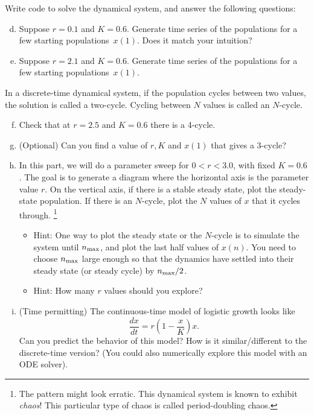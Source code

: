\documentclass{exam}
\begin{document}
Write code to solve the dynamical system, and answer the following questions:
\begin{enumerate}[a.]
\setcounter{enumi}{3}
\item Suppose $r=0.1$ and $K=0.6$. Generate time series of the populations for a few starting populations~$x(1)$. Does it match your intuition?
\item Suppose $r=2.1$ and $K=0.6$. Generate time series of the populations for a few starting populations~$x(1)$. 
\end{enumerate}
In a discrete-time dynamical system, if the population cycles between two values, the solution is called a two-cycle. Cycling between $N$ values is called an $N$-cycle. 
\begin{enumerate}[a.]
\setcounter{enumi}{5}
\item Check that at $r=2.5$ and $K=0.6$ there is a 4-cycle. 
\item (Optional) Can you find a value of $r,K$ and $x(1)$ that gives a 3-cycle?
\item In this part, we will do a parameter sweep for $0<r<3.0$, with fixed $K=0.6$. The goal is to generate a diagram where the horizontal axis is the parameter value $r$. On the vertical axis, if there is a stable steady state, plot the steady-state population. If there is an $N$-cycle, plot the $N$ values of $x$ that it cycles through. \footnote{The pattern might look erratic. This dynamical system is known to exhibit \emph{chaos}!  This particular type of chaos is called period-doubling chaos.}
\begin{itemize}
\item Hint: One way to plot the steady state or the $N$-cycle is to simulate the system until $n_{\rm max}$, and plot the last half values of $x(n)$. You need to choose $n_{\rm max}$ large enough so that the dynamics have settled into their steady state (or steady cycle) by $n_{\rm max}/2$.
\item Hint: How many $r$ values should you explore? 
\end{itemize}
\item (Time permitting) The continuous-time model of logistic growth looks like
\begin{equation}
\frac{dx}{dt} = r\left(1-\frac{x}{K}\right)x.
\end{equation}
Can you predict the behavior of this model? How is it similar/different to the discrete-time version? (You could also numerically explore this model with an ODE solver).
\end{enumerate}

  
\end{document}
